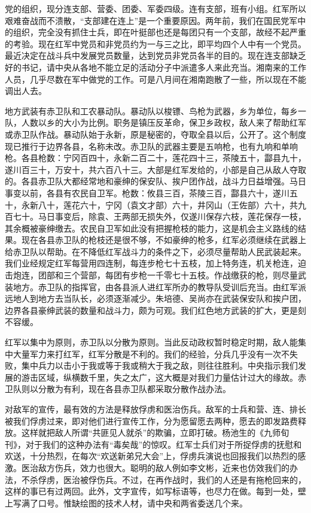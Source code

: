 党的组织，现分连支部、营委、团委、军委四级。连有支部，班有小组。红军所以艰难奋战而不溃散，“支部建在连上”是一个重要原因。两年前，我们在国民党军中的组织，完全没有抓住士兵，即在叶挺部也还是每团只有一个支部，故经不起严重的考验。现在红军中党员和非党员约为一与三之比，即平均四个人中有一个党员。最近决定在战斗兵中发展党员数量，达到党员非党员各半的目的。现在连支部缺乏好的书记，请中央从各地不能立足的活动分子中派遣多人来此充当。湘南来的工作人员，几乎尽数在军中做党的工作。可是八月间在湘南跑散了一些，所以现在不能调出人去。

地方武装有赤卫队和工农暴动队。暴动队以梭镖、鸟枪为武器，乡为单位，每乡一队，人数以乡的大小为比例。职务是镇压反革命，保卫乡政权，敌人来了帮助红军或赤卫队作战。暴动队始于永新，原是秘密的，夺取全县以后，公开了。这个制度现已推行于边界各县，名称未改。赤卫队的武器主要是五响枪，也有九响和单响枪。各县枪数：宁冈百四十，永新二百二十，莲花四十三，茶陵五十，酃县九十，遂川百三十，万安十，共六百八十三。大部是红军发给的，小部是自己从敌人夺取的。各县赤卫队大都经常地和豪绅的保安队、挨户团作战，战斗力日益增强。马日事变以前，各县有农民自卫军。枪数：攸县三百，茶陵三百，酃县六十，遂川五十，永新八十，莲花六十，宁冈（袁文才部）六十，井冈山（王佐部）六十，共九百七十。马日事变后，除袁、王两部无损失外，仅遂川保存六枝，莲花保存一枝，其余概被豪绅缴去。农民自卫军如此没有把握枪枝的能力，这是机会主义路线的结果。现在各县赤卫队的枪枝还是很不够，不如豪绅的枪多，红军必须继续在武器上给赤卫队以帮助。在不降低红军战斗力的条件之下，必须尽量帮助人民武装起来。我们业经规定红军每营用四连制，每连步枪七十五枝，加上特务连，机关枪连，迫击炮连，团部和三个营部，每团有步枪一千零七十五枝。作战缴获的枪，则尽量武装地方。赤卫队的指挥官，由各县派人进红军所办的教导队受训后充当。由红军派远地人到地方去当队长，必须逐渐减少。朱培德、吴尚亦在武装保安队和挨户团，边界各县豪绅武装的数量和战斗力，颇为可观。我们红色地方武装的扩大，更是刻不容缓。

红军以集中为原则，赤卫队以分散为原则。当此反动政权暂时稳定时期，敌人能集中大量军力来打红军，红军分散是不利的。我们的经验，分兵几乎没有一次不失败，集中兵力以击小于我或等于我或稍大于我之敌，则往往胜利。中央指示我们发展的游击区域，纵横数千里，失之太广，这大概是对我们力量估计过大的缘故。赤卫队则以分散为有利，现在各县赤卫队都采取分散作战办法。

对敌军的宣传，最有效的方法是释放俘虏和医治伤兵。敌军的士兵和营、连、排长被我们俘虏过来，即对他们进行宣传工作，分为愿留愿去两种，愿去的即发路费释放。这样就把敌人所谓“共匪见人就杀”的欺骗，立即打破。杨池生的《九师旬刊》，对于我们的这种办法有“毒矣哉”的惊叹。红军士兵们对于所捉俘虏的抚慰和欢送，十分热烈，在每次“欢送新弟兄大会”上，俘虏兵演说也回报我们以热烈的感激。医治敌方伤兵，效力也很大。聪明的敌人例如李文彬，近来也仿效我们的办法，不杀俘虏，医治被俘伤兵。不过，在再作战时，我们的人还是有拖枪回来的，这样的事已有过两回。此外，文字宣传，如写标语等，也尽力在做。每到一处，壁上写满了口号。惟缺绘图的技术人材，请中央和两省委送几个来。

